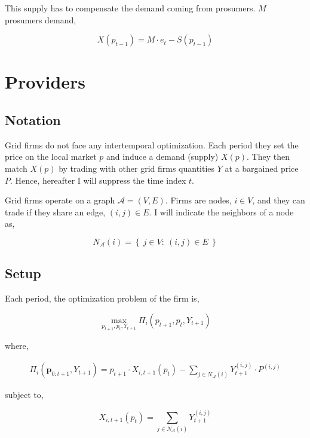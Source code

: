 \documentclass[american]{scrartcl}
\newcommand{\matr}[1]{\bm{#1}}
\newcommand{\set}[1]{\left\{#1\right\}}
\begin{document}
This supply has to compensate the demand coming from prosumers. $M$ prosumers demand,

\begin{equation}
	X(p_{t-1}) = M \cdot e_t - S(p_{t-1})
\end{equation}

\section{Providers}

\subsection{Notation}

Grid firms do not face any intertemporal optimization. Each period they set the price on the local market $p$ and induce a demand (supply) $X(p)$. They then match $X(p)$ by trading with other grid firms quantities $Y$ at a bargained price $P$. Hence, hereafter I will suppress the time index $t$.

Grid firms operate on a graph $\mathcal{A} = (V, E)$. Firms are nodes, $i \in V$, and they can trade if they share an edge, $(i, j) \in E$. I will indicate the neighbors of a node as,

\begin{equation}
	N_{\mathcal{A}}(i) = \set{ \ j \in V: \ (i, j) \in E \ }
\end{equation}

\subsection{Setup}

Each period, the optimization problem of the firm is,

\begin{equation}
	\max_{p_{t+1}, p_t, Y_{t+1}} \Pi_i(p_{t+1}, p_t, Y_{t+1})
\end{equation}

where,

\begin{equation}
	\begin{split}
		\Pi_i(\matr{p}_{0:t+1}, Y_{t+1}) = p_{t+1} \cdot X_{i, t+1}(p_t) - \sum_{j \in N_{\mathcal{A}}(i)} Y_{t+1}^{(i, j)} \cdot P^{(i, j)}
	\end{split}
\end{equation}

subject to,

\begin{equation}
	X_{i, t+1}(p_t) =  \sum_{j \in N_{\mathcal{A}}(i)} Y_{t+1}^{(i, j)}
\end{equation}
\end{document}
